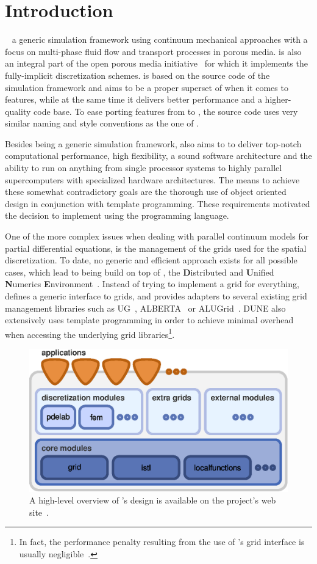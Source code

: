 \chapter{Introduction}

\eWoms~\cite{EWOMS-HP} a generic simulation framework using continuum
mechanical approaches with a focus on multi-phase fluid flow and
transport processes in porous media. \eWoms is also an integral part
of the open porous media initiative~\cite{OPM-HP} for which it
implements the fully-implicit discretization schemes. \eWoms is based
on the source code of the \Dumux~\cite{DUMUX-HP} simulation framework
and aims to be a proper superset of \Dumux when it comes to features,
while at the same time it delivers better performance and a
higher-quality code base. To ease porting features from \Dumux to
\eWoms, the \eWoms source code uses very similar naming and style
conventions as the one of \Dumux.

Besides being a generic simulation framework, \eWoms also aims to to
deliver top-notch computational performance, high flexibility, a sound
software architecture and the ability to run on anything from single
processor systems to highly parallel supercomputers with specialized
hardware architectures. The means to achieve these somewhat
contradictory goals are the thorough use of object oriented design in
conjunction with template programming. These requirements motivated
the decision to implement \eWoms using the \Cplusplus programming
language.

One of the more complex issues when dealing with parallel continuum
models for partial differential equations, is the management of the
grids used for the spatial discretization. To date, no generic and
efficient approach exists for all possible cases, which lead to \eWoms
being build on top of \Dune, the \textbf{D}istributed and
\textbf{U}nified \textbf{N}umerics
\textbf{E}nvironment~\cite{DUNE-HP}. Instead of trying to implement a
grid for everything, \Dune defines a generic \Cplusplus interface to
grids, and provides adapters to several existing grid management
libraries such as UG~\cite{UG-HP}, ALBERTA~\cite{ALBERTA-HP} or
ALUGrid~\cite{ALUGRID-HP}. DUNE also extensively uses template
programming in order to achieve minimal overhead when accessing the
underlying grid libraries\footnote{In fact, the performance penalty
  resulting from the use of \Dune's grid interface is usually
  negligible~\cite{BURRI2006}.}.
\begin{figure}[hbt]
  \centering 
  \includegraphics[width=.5\linewidth, keepaspectratio]{EPS/dunedesign}
  \caption{
    \label{fig:dune-design}
    A high-level overview of \Dune's design is available on the project's
    web site~\cite{DUNE-HP}.
  }
\end{figure}

